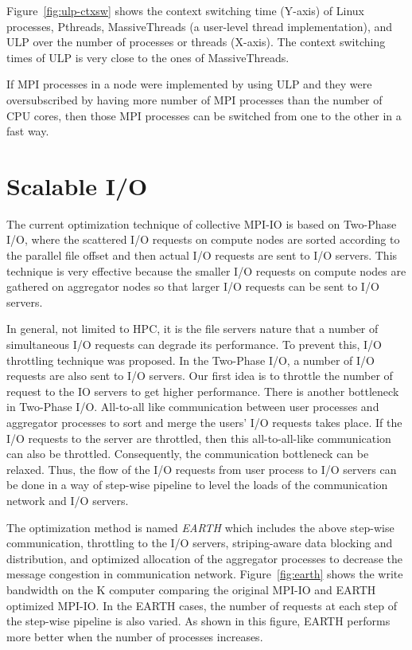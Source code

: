 Figure~\ref{fig:ulp-ctxsw} shows the context switching time (Y-axis)
of Linux processes, Pthreads, MassiveThreads\cite{Nakashima2014} (a
user-level thread implementation), and ULP over the number of
processes or threads (X-axis). The context switching times of ULP is
very close to the ones of MassiveThreads.

If MPI processes in a node were implemented by using ULP and they were
oversubscribed by having more number of MPI processes than the number
of CPU cores, then those MPI processes can be switched from one to
the other in a fast way. 

\section{Scalable I/O}

The current optimization technique of collective MPI-IO\cite{romio} is
based on Two-Phase I/O\cite{two-phase}, where the scattered I/O
requests on compute nodes are 
sorted according to the parallel file offset and then actual I/O
requests are sent to I/O servers. This technique is very effective
because the smaller I/O requests on compute nodes are gathered on
aggregator nodes so that larger I/O requests can be sent to I/O
servers. 

In general, not limited to HPC, it is the file servers nature that a
number of simultaneous I/O requests can degrade its performance. To
prevent this, I/O throttling technique was proposed. In the Two-Phase
I/O, a number of I/O requests are also sent to I/O servers. Our first
idea is to throttle the number of request to the IO servers to get
higher performance. There is another bottleneck in Two-Phase
I/O. All-to-all like communication between user processes and
aggregator processes to sort and merge the users' I/O requests takes
place. If the I/O requests to the server are throttled, then this
all-to-all-like communication can also be throttled. Consequently, the
communication bottleneck can be relaxed. Thus, the flow  
of the I/O requests from user process to I/O servers can be done in a
way of step-wise pipeline to level the loads of the communication
network and I/O servers.

The optimization method is named {\em EARTH} which includes the above
step-wise communication, throttling to the I/O servers,
striping-aware data blocking and distribution, and 
optimized allocation of the aggregator processes to decrease the message
congestion in communication
network\cite{tsujita:WS_EuroMPI2014,tsujita:hpcasia18}. 
Figure~\ref{fig:earth} shows the 
write bandwidth on the K computer\cite{k-computer} comparing the
original MPI-IO and 
EARTH optimized MPI-IO. In the EARTH cases, the number of requests at
each step of the step-wise pipeline is also varied. As shown in this
figure, EARTH performs more better when the number of processes
increases. 


